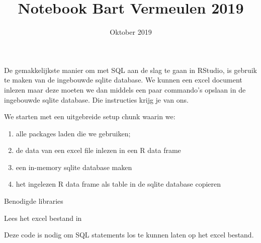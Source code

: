 \documentclass[]{article}
\title{Notebook Bart Vermeulen 2019}
\author{}
\date{Oktober 2019}
\newenvironment{Shaded}{\begin{snugshade}}{\end{snugshade}}
\newcommand{\CommentTok}[1]{\textcolor[rgb]{0.56,0.35,0.01}{\textit{#1}}}
\newcommand{\DataTypeTok}[1]{\textcolor[rgb]{0.13,0.29,0.53}{#1}}
\newcommand{\KeywordTok}[1]{\textcolor[rgb]{0.13,0.29,0.53}{\textbf{#1}}}
\newcommand{\NormalTok}[1]{#1}
\newcommand{\OperatorTok}[1]{\textcolor[rgb]{0.81,0.36,0.00}{\textbf{#1}}}
\newcommand{\StringTok}[1]{\textcolor[rgb]{0.31,0.60,0.02}{#1}}
\providecommand{\tightlist}{%
  \setlength{\itemsep}{0pt}\setlength{\parskip}{0pt}}
\begin{document}
\maketitle

De gemakkelijkste manier om met SQL aan de slag te gaan in RStudio, is
gebruik te maken van de ingebouwde sqlite database. We kunnen een excel
document inlezen maar deze moeten we dan middels een paar commando's
opslaan in de ingebouwde sqlite database. Die instructies krijg je van
ons.

We starten met een uitgebreide setup chunk waarin we:

\begin{enumerate}
\def\labelenumi{\arabic{enumi}.}
\tightlist
\item
  alle packages laden die we gebruiken;
\item
  de data van een excel file inlezen in een R data frame
\item
  een in-memory sqlite database maken
\item
  het ingelezen R data frame als table in de sqlite database copieren
\end{enumerate}

Benodigde libraries

Lees het excel bestand in

Deze code is nodig om SQL statements los te kunnen laten op het excel
bestand.

\begin{Shaded}
\end{Shaded}
\end{document}
